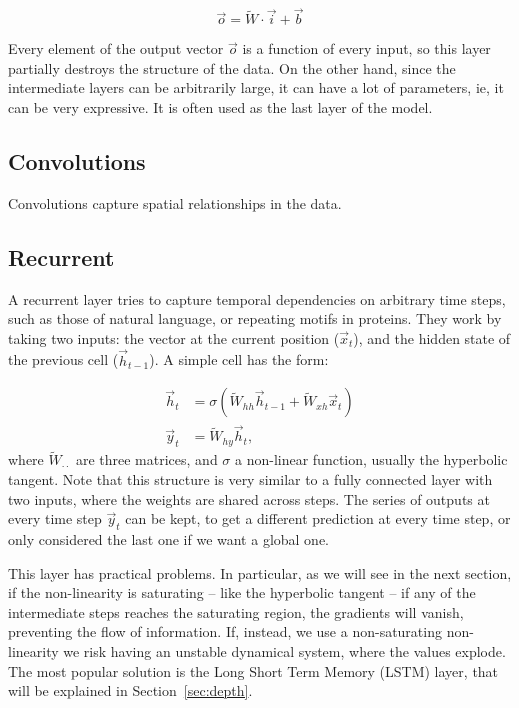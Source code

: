\begin{equation*}
\vec{o} = \widetilde W \cdot \vec{i} + \vec{b}
\end{equation*}

Every element of the output vector $\vec o$ is a function of every input, so this layer partially destroys the structure of the data.
On the other hand, since the intermediate layers can be arbitrarily large, it can have a lot of parameters, ie, it can be very expressive.
It is often used as the last layer of the model.

\subsection{Convolutions}
Convolutions capture spatial relationships in the data.

\subsection{Recurrent}
A recurrent layer tries to capture temporal dependencies on arbitrary time steps, such as those of natural language, or repeating motifs in proteins.
They work by taking two inputs: the vector at the current position ($\vec x_t$), and the hidden state of the previous cell ($\vec h_{t-1}$).
A simple cell has the form:

\begin{align*}
\vec h_t &= \sigma\left(\widetilde W_{hh} \vec{h}_{t-1} + \widetilde W_{xh} \vec{x}_{t}\right) \\
\vec y_t &=  \widetilde W_{hy} \vec h_t,
\end{align*}
where $ \widetilde W_{\cdot \cdot}$ are three matrices, and $\sigma$ a non-linear function, usually the hyperbolic tangent.
Note that this structure is very similar to a fully connected layer with two inputs, where the weights are shared across steps.
The series of outputs at every time step $\vec y_t$ can be kept, to get a different prediction at every time step, or only considered the last one if we want a global one.

This layer has practical problems. 
In particular, as we will see in the next section, if the non-linearity is saturating -- like the hyperbolic tangent -- if any of the intermediate steps reaches the saturating region, the gradients will vanish, preventing the flow of information.
If, instead, we use a non-saturating non-linearity we risk having an unstable dynamical system, where the values explode.
The most popular solution  is the Long Short Term Memory (LSTM) layer, that will be explained in Section~\ref{sec:depth}.


